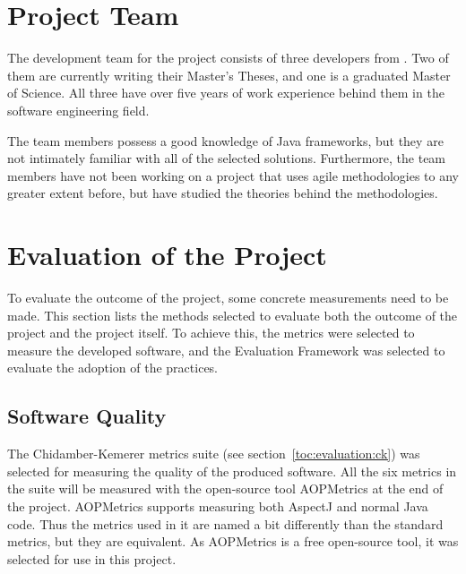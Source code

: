 \section{Project Team}
\label{toc:selected:team}

The development team for the project consists of three developers from 
. Two of them are currently writing their 
Master's Theses, and one is a graduated Master of Science. All three 
have over five years of work experience behind them in the software 
engineering field.

The team members possess a good knowledge of Java frameworks, but they 
are not intimately familiar with all of the selected solutions. 
Furthermore, the team members have not been working on a project that 
uses agile methodologies to any greater extent before, but have 
studied the theories behind the methodologies.


\section{Evaluation of the Project}
\label{toc:selected:evaluation}

To evaluate the outcome of the project, some concrete measurements 
need to be made. This section lists the methods selected to evaluate 
both the outcome of the project and the project itself. To achieve 
this, the  metrics were selected to measure the developed 
software, and the  Evaluation Framework was selected to 
evaluate the adoption of the  practices.


\subsection{Software Quality}
\label{toc:selected:evaluation:quality}

The Chidamber-Kemerer metrics suite (see 
section~\ref{toc:evaluation:ck}) was selected for measuring the 
quality of the produced software. All the six metrics in the 
 suite will be measured with the open-source tool 
AOPMetrics \citep{aopmetrics} at the end of the project. AOPMetrics 
supports measuring both AspectJ and normal Java code. Thus the metrics 
used in it are named a bit differently than the standard  
metrics, but they are equivalent. As AOPMetrics is a free open-source 
tool, it was selected for use in this project.

